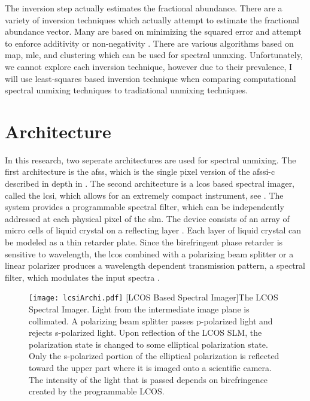 The inversion step actually estimates the \gls{fractional abundance}. There are a variety of inversion techniques which actually attempt to estimate the fractional abundance vector. Many are based on minimizing the squared error and attempt to enforce additivity or non-negativity \cite{keshava2003survey, lawson1995solving}. There are various algorithms based on \acrfull{map}, \acrfull{mle}, and clustering which can be used for spectral unmxing. Unfortunately, we cannot explore each inversion technique, however due to their prevalence, I will use least-squares based inversion technique when comparing computational spectral unmixing techniques to tradiational unmixing techniques.

\section{Architecture}

In this research, two seperate architectures are used for spectral unmixing. The first architecture is the \gls{afss}, which is the single pixel version of the \gls{afssi-c} described in depth in . The second architecture is a \acrfull{lcos} based spectral imager, called the \gls{lcsi}, which allows for an extremely compact instrument, see . The system provides a programmable spectral filter, which can be independently addressed at each physical pixel of the \gls{slm}. The device consists of an array of micro cells of liquid crystal on a reflecting layer \cite{lazarev2012lcos}. Each layer of liquid crystal can be modeled as a thin retarder plate. Since the birefringent phase retarder is sensitive to wavelength, the \gls{lcos} combined with a polarizing beam splitter or a linear polarizer produces a wavelength dependent transmission pattern, a spectral filter, which modulates the input spectra \cite{yuan2015compressive}.

\begin{figure}
	\texttt{[image: lcsiArchi.pdf]}
	[LCOS Based Spectral Imager]{The LCOS Spectral Imager. Light from the intermediate image plane is collimated. A polarizing beam splitter passes p-polarized light and rejects s-polarized light. Upon reflection of the LCOS SLM, the polarization state is changed to some elliptical polarization state. Only the s-polarized portion of the elliptical polarization is reflected toward the upper part where it is imaged onto a scientific camera. The intensity of the light that is passed depends on birefringence created by the programmable LCOS.}
	\label{fig:lcsiArchi}
\end{figure}

